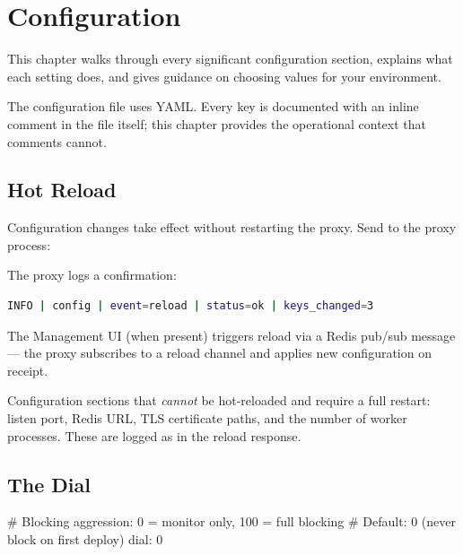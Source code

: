 
\chapter{Configuration}
\label{ch:configuration}

This chapter walks through every significant configuration section, explains what
each setting does, and gives guidance on choosing values for your environment.

The configuration file uses YAML. Every key is documented with an inline comment
in the file itself; this chapter provides the operational context that comments
cannot.

\section{Hot Reload}
\label{sec:hotreload}

Configuration changes take effect without restarting the proxy. Send 
to the proxy process:


The proxy logs a confirmation:
\begin{lstlisting}[language=bash, numbers=none]
INFO | config | event=reload | status=ok | keys_changed=3
\end{lstlisting}

The Management UI (when present) triggers reload via a Redis pub/sub message —
the proxy subscribes to a reload channel and applies new configuration on receipt.

Configuration sections that \emph{cannot} be hot-reloaded and require a full
restart: listen port, Redis URL, TLS certificate paths, and the number of worker
processes. These are logged as  in the reload response.

\section{The Dial}

\begin{yamlcode}
# Blocking aggression: 0 = monitor only, 100 = full blocking
# Default: 0 (never block on first deploy)
dial: 0
\end{yamlcode}

